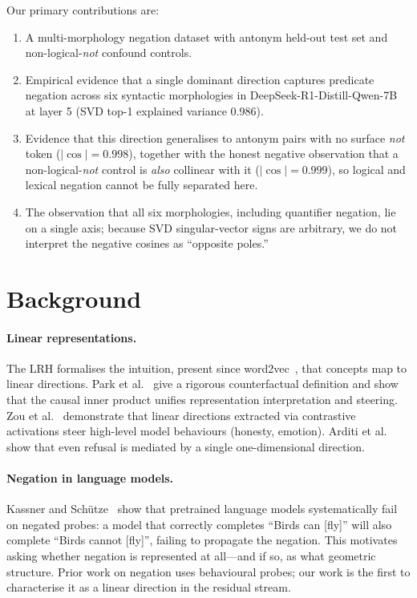 \documentclass{article}
\begin{document}
Our primary contributions are:
\begin{enumerate}
  \item A multi-morphology negation dataset with antonym held-out test set and non-logical-\textit{not} confound controls.
  \item Empirical evidence that a single dominant direction captures predicate negation across six syntactic morphologies in DeepSeek-R1-Distill-Qwen-7B at layer 5 (SVD top-1 explained variance 0.986).
  \item Evidence that this direction generalises to antonym pairs with no surface \textit{not} token ($|\cos|=0.998$), together with the honest negative observation that a non-logical-\textit{not} control is \emph{also} collinear with it ($|\cos|=0.999$), so logical and lexical negation cannot be fully separated here.
  \item The observation that all six morphologies, including quantifier negation, lie on a single axis; because SVD singular-vector signs are arbitrary, we do not interpret the negative cosines as ``opposite poles.''
\end{enumerate}

\section{Background}
\label{sec:background}

\paragraph{Linear representations.}
The LRH formalises the intuition, present since word2vec~\citep{hernandez2023linearity}, that concepts map to linear directions.
Park et al.\ \citep{park2024linear} give a rigorous counterfactual definition and show that the causal inner product unifies representation interpretation and steering.
Zou et al.\ \citep{zou2023representation} demonstrate that linear directions extracted via contrastive activations steer high-level model behaviours (honesty, emotion).
Arditi et al.\ \citep{arditi2024refusal} show that even refusal is mediated by a single one-dimensional direction.

\paragraph{Negation in language models.}
Kassner and Sch\"utze~\citep{kassner2020negated} show that pretrained language models systematically fail on negated probes: a model that correctly completes ``Birds can [fly]'' will also complete ``Birds cannot [fly]'', failing to propagate the negation.
This motivates asking whether negation is represented at all---and if so, as what geometric structure.
Prior work on negation uses behavioural probes; our work is the first to characterise it as a linear direction in the residual stream.
\end{document}
